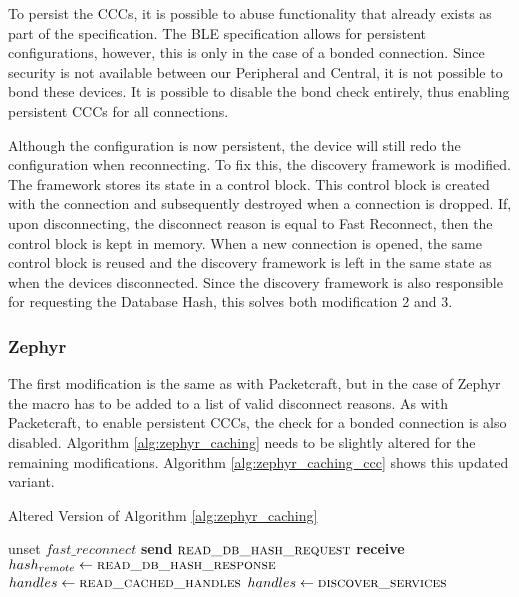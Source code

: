 To persist the CCCs, it is possible to abuse functionality that already exists as part of the specification. The BLE specification allows for persistent configurations, however, this is only in the case of a bonded connection. Since security is not available between our Peripheral and Central, it is not possible to bond these devices. It is possible to disable the bond check entirely, thus enabling persistent CCCs for all connections.

Although the configuration is now persistent, the device will still redo the configuration when reconnecting. To fix this, the discovery framework is modified. The framework stores its state in a control block. This control block is created with the connection and subsequently destroyed when a connection is dropped. If, upon disconnecting, the disconnect reason is equal to Fast Reconnect, then the control block is kept in memory. When a new connection is opened, the same control block is reused and the discovery framework is left in the same state as when the devices disconnected. Since the discovery framework is also responsible for requesting the Database Hash, this solves both modification 2 and 3.

\subsubsection{Zephyr}
The first modification is the same as with Packetcraft, but in the case of Zephyr the macro has to be added to a list of valid disconnect reasons. As with Packetcraft, to enable persistent CCCs, the check for a bonded connection is also disabled. Algorithm \ref{alg:zephyr_caching} needs to be slightly altered for the remaining modifications. Algorithm \ref{alg:zephyr_caching_ccc} shows this updated variant.

\begin{algorithm}
    \caption{Altered Version of Algorithm \ref{alg:zephyr_caching}}
    \label{alg:zephyr_caching_ccc}
    \begin{algorithmic}[1] 
                \State unset $fast\_reconnect$
                \State \Return
            \EndIf
            \State \textbf{send} $\Call{read\_db\_hash\_request}{}$
            \State \textbf{receive} $hash_{remote} \gets \Call{read\_db\_hash\_response}{}$
                    \State $handles \gets \Call{read\_cached\_handles}{}$
                    \State {}
                    \State \Return
                \EndIf
            \EndIf
            \State $handles \gets\Call{discover\_services}{}$
            \State {}
            \State {}
        \EndProcedure
    \end{algorithmic}
\end{algorithm}


